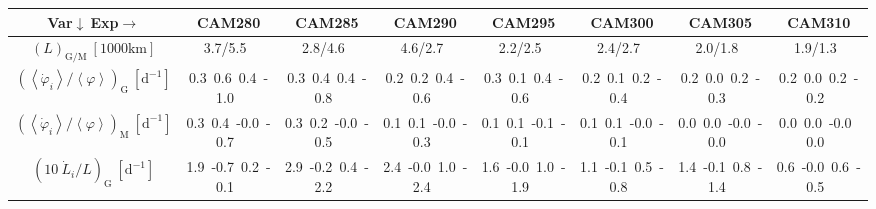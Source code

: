 \setlength\tabcolsep{1.5pt}

\begin{table}[H]
{\footnotesize
\begin{centering}
\begin{tabular}{|c|c|c|c|c|c|c|c|}
\hline
Var$\downarrow\ $Exp$\rightarrow$ & CAM280 & CAM285 & CAM290 & CAM295 & CAM300 & CAM305 & CAM310 \tabularnewline
\hline
\hline
$\left(L\right)_{\mathrm{G/M}}\ \left[1000\mathrm{km}\right]$ & 3.7/5.5\ & 2.8/4.6\ & 4.6/2.7\ & 2.2/2.5\ & 2.4/2.7\ & 2.0/1.8\ & 1.9/1.3\ \tabularnewline
\hline
$\left(\left\langle \dot{\varphi}_{i}\right\rangle /\left\langle \varphi\right\rangle\right) _{\mathrm{G}}\ \left[\mathrm{d^{-1}}\right]$ & \textcolor{C1}{0.3}\ \textcolor{C2}{0.6}\ \textcolor{C3}{0.4}\ \textcolor{C4}{-1.0}\  & \textcolor{C1}{0.3}\ \textcolor{C2}{0.4}\ \textcolor{C3}{0.4}\ \textcolor{C4}{-0.8}\  & \textcolor{C1}{0.2}\ \textcolor{C2}{0.2}\ \textcolor{C3}{0.4}\ \textcolor{C4}{-0.6}\  & \textcolor{C1}{0.3}\ \textcolor{C2}{0.1}\ \textcolor{C3}{0.4}\ \textcolor{C4}{-0.6}\  & \textcolor{C1}{0.2}\ \textcolor{C2}{0.1}\ \textcolor{C3}{0.2}\ \textcolor{C4}{-0.4}\  & \textcolor{C1}{0.2}\ \textcolor{C2}{0.0}\ \textcolor{C3}{0.2}\ \textcolor{C4}{-0.3}\  & \textcolor{C1}{0.2}\ \textcolor{C2}{0.0}\ \textcolor{C3}{0.2}\ \textcolor{C4}{-0.2}\  \tabularnewline
\hline
$\left(\left\langle \dot{\varphi}_{i}\right\rangle /\left\langle \varphi\right\rangle\right) _{\mathrm{M}}\ \left[\mathrm{d^{-1}}\right]$ & \textcolor{C1}{0.3}\ \textcolor{C2}{0.4}\ \textcolor{C3}{-0.0}\ \textcolor{C4}{-0.7}\  & \textcolor{C1}{0.3}\ \textcolor{C2}{0.2}\ \textcolor{C3}{-0.0}\ \textcolor{C4}{-0.5}\  & \textcolor{C1}{0.1}\ \textcolor{C2}{0.1}\ \textcolor{C3}{-0.0}\ \textcolor{C4}{-0.3}\  & \textcolor{C1}{0.1}\ \textcolor{C2}{0.1}\ \textcolor{C3}{-0.1}\ \textcolor{C4}{-0.1}\  & \textcolor{C1}{0.1}\ \textcolor{C2}{0.1}\ \textcolor{C3}{-0.0}\ \textcolor{C4}{-0.1}\  & \textcolor{C1}{0.0}\ \textcolor{C2}{0.0}\ \textcolor{C3}{-0.0}\ \textcolor{C4}{-0.0}\  & \textcolor{C1}{0.0}\ \textcolor{C2}{0.0}\ \textcolor{C3}{-0.0}\ \textcolor{C4}{0.0}\  \tabularnewline
\hline
$\left(10\ \dot{L}_{i}/L\right)_{\mathrm{G}}\ \left[\mathrm{d^{-1}}\right]$ & \textcolor{C1}{1.9}\ \textcolor{C2}{-0.7}\ \textcolor{C3}{0.2}\ \textcolor{C4}{-0.1}\  & \textcolor{C1}{2.9}\ \textcolor{C2}{-0.2}\ \textcolor{C3}{0.4}\ \textcolor{C4}{-2.2}\  & \textcolor{C1}{2.4}\ \textcolor{C2}{-0.0}\ \textcolor{C3}{1.0}\ \textcolor{C4}{-2.4}\  & \textcolor{C1}{1.6}\ \textcolor{C2}{-0.0}\ \textcolor{C3}{1.0}\ \textcolor{C4}{-1.9}\  & \textcolor{C1}{1.1}\ \textcolor{C2}{-0.1}\ \textcolor{C3}{0.5}\ \textcolor{C4}{-0.8}\  & \textcolor{C1}{1.4}\ \textcolor{C2}{-0.1}\ \textcolor{C3}{0.8}\ \textcolor{C4}{-1.4}\  & \textcolor{C1}{0.6}\ \textcolor{C2}{-0.0}\ \textcolor{C3}{0.6}\ \textcolor{C4}{-0.5}\  \tabularnewline

\end{tabular}
\end{centering}}
\end{table}
